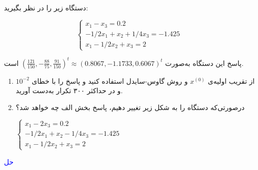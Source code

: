 \\
دستگاه زیر را در نظر بگیرید:
\begin{center}
\[
    \begin{cases}
      x_1 - x_3 = 0.2\\
      - 1/2x_1 + x_2 + 1/4x_3 = -1.425\\
      x_1 - 1/2x_2 + x_3 = 2
    \end{cases}
\]
\end{center}

پاسخ این دستگاه به‌صورت
$(\frac{121}{150}, -\frac{88}{75}, \frac{91}{150})^t
\approx (0.8067, -1.1733, 0.6067)^t$
است.
\begin{enumerate}
\item
از تقریب اولیه‌ی $x^{(0)}$ و روش گاوس-سایدل استفاده کنید و پاسخ را با خطای
$10^{-2}$
و در حداکثر ۳۰۰ تکرار به‌دست آورید.
\item
در‌صورتی‌که دستگاه را به شکل زیر تغییر دهیم، پاسخ بخش الف چه خواهد شد؟
\begin{center}
$
	\begin{cases}
      	x_1 - 2x_3 = 0.2\\
      	- 1/2x_1 + x_2 - 1/4x_3 = -1.425\\
      	x_1 - 1/2x_2 + x_3 = 2
    	\end{cases}
    $
\end{center}
\end{enumerate}

\textcolor{blue}{
حل
\\

}
